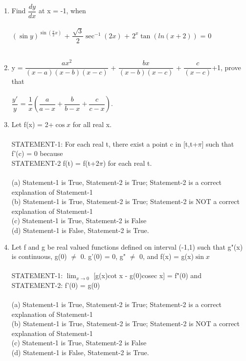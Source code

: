 \begin{enumerate}[label=\arabic*.,ref=\thesubsection.\theenumi]
	\item Find $\dfrac{dy}{dx}$ at x = -1, when\\
	\\
	$(\sin y)^{\sin\left(\frac{\pi}{2} x \right)}$ + $\dfrac{\sqrt{3}}{2}\sec^{-1}(2x)$ + $2^x \tan(ln(x+2))$ = 0\\
	\\
	\item  y = $\dfrac{ax^2}{(x-a)(x-b)(x-c)}$ + $\dfrac{bx}{(x-b)(x-c)}$ + $\dfrac{c}{(x-c)}$+1, prove that\\
	\\
	 $\dfrac{y'}{y}$ = $\dfrac{1}{x}\left(\dfrac{a}{a-x}+\dfrac{b}{b-x}+\dfrac{c}{c-x}\right)$.\\
	\item Let f(x) = 2+$\cos x$ for all real x.
	\\
	\\
	STATEMENT-1: For each real t, there exist a point c in [t,t+$\pi$] such that f'(c) = 0 because\\
	STATEMENT-2 f(t) = f(t+2$\pi$) for each real t.\\
	\\
	(a) Statement-1 is True, Statement-2 is True; Statement-2 is a correct explanation of Statement-1\\
	(b) Statement-1 is True, Statement-2 is True; Statement-2 is NOT a correct explanation of Statement-1\\
	(c) Statement-1 is True, Statement-2 is False\\
	(d) Statement-1 is False, Statement-2 is True.\\
	\item Let f and g be real valued functions defined on interval (-1,1) such that g"(x) is continuous, g(0) $\neq$ 0. g'(0) = 0, g" $\neq$ 0, and f(x) = g(x)$\sin x$\\
	\\
	STATEMENT-1: $\displaystyle{\lim_{x \to 0}}$ [g(x)cot x - g(0)cosec x] = f"(0) and\\
	STATEMENT-2: f'(0) = g(0)\\
	\\
	(a) Statement-1 is True, Statement-2 is True; Statement-2 is a correct explanation of Statement-1\\
	(b) Statement-1 is True, Statement-2 is True; Statement-2 is NOT a correct explanation of Statement-1\\
	(c) Statement-1 is True, Statement-2 is False\\
	(d) Statement-1 is False, Statement-2 is True.\\

\end{enumerate}
